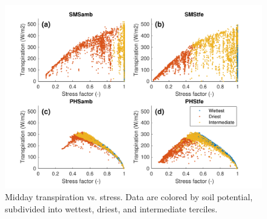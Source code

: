 \documentclass[draft,linenumbers]{agujournal}
\begin{document}
  \begin{figure}[h]
     \centering
     \includegraphics[width=30pc]{../figs3/supptstress.pdf}
     \caption{Midday transpiration vs. stress. 
     Data are colored by soil potential, subdivided into wettest, driest, and intermediate terciles.}
     \label{supp:tstress}
  \end{figure}
  \clearpage
\end{document}
